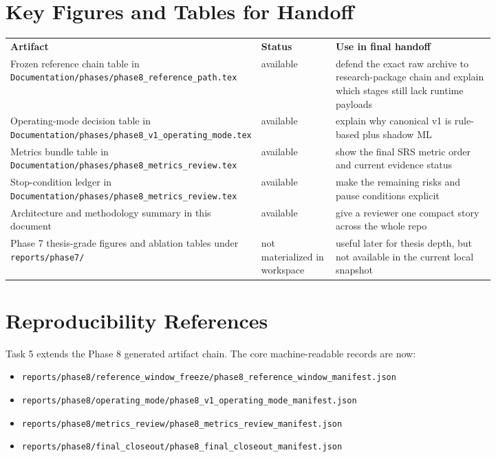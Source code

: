 \documentclass{article}
\begin{document}
\section*{Key Figures and Tables for Handoff}
\begin{longtable}{p{0.28\linewidth}p{0.16\linewidth}p{0.38\linewidth}}
\textbf{Artifact} & \textbf{Status} & \textbf{Use in final handoff} \\
Frozen reference chain table in \texttt{Documentation/phases/phase8\_reference\_path.tex} & available & defend the exact raw archive to research-package chain and explain which stages still lack runtime payloads \\
Operating-mode decision table in \texttt{Documentation/phases/phase8\_v1\_operating\_mode.tex} & available & explain why canonical v1 is rule-based plus shadow ML \\
Metrics bundle table in \texttt{Documentation/phases/phase8\_metrics\_review.tex} & available & show the final SRS metric order and current evidence status \\
Stop-condition ledger in \texttt{Documentation/phases/phase8\_metrics\_review.tex} & available & make the remaining risks and pause conditions explicit \\
Architecture and methodology summary in this document & available & give a reviewer one compact story across the whole repo \\
Phase 7 thesis-grade figures and ablation tables under \texttt{reports/phase7/} & not materialized in workspace & useful later for thesis depth, but not available in the current local snapshot \\
\end{longtable}

\section*{Reproducibility References}
Task 5 extends the Phase 8 generated artifact chain. The core machine-readable records are now:
\begin{itemize}
\item \texttt{reports/phase8/reference\_window\_freeze/phase8\_reference\_window\_manifest.json}
\item \texttt{reports/phase8/operating\_mode/phase8\_v1\_operating\_mode\_manifest.json}
\item \texttt{reports/phase8/metrics\_review/phase8\_metrics\_review\_manifest.json}
\item \texttt{reports/phase8/final\_closeout/phase8\_final\_closeout\_manifest.json}
\end{itemize}
\end{document}
